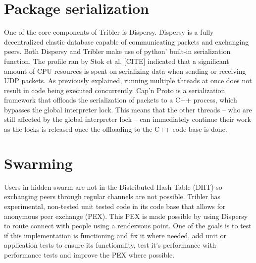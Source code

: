 \section{Package serialization}
One of the core components of Tribler is Dispersy. Dispersy is a fully decentralized elastic database capable of communicating packets and exchanging peers.
Both Dispersy and Tribler make use of python' built-in serialization function.
The profile ran by Stok et al. [CITE] indicated that a significant amount of CPU resources is spent on serializing data when sending or receiving UDP packets.
As previously explained, running multiple threads at once does not result in code being executed concurrently.
Cap'n Proto is a serialization framework that offloads the serialization of packets to a C++ process, which bypasses the global interpreter lock.
This means that the other threads -- who are still affected by the global interpreter lock -- can immediately continue their work as the locks is released once the offloading to the C++ code base is done.

\section{Swarming}
Users in hidden swarm are not in the Distributed Hash Table (DHT) so exchanging peers through regular channels are not possible.
Tribler has experimental, non-tested unit tested code in its code base that allows for anonymous peer exchange (PEX).
This PEX is made possible by using Dispersy to route connect with people using a rendezvous point.
One of the goals is to test if this implementation is functioning and fix it where needed, add unit or application tests to ensure its functionality, test it's performance with performance tests and improve the PEX where possible.